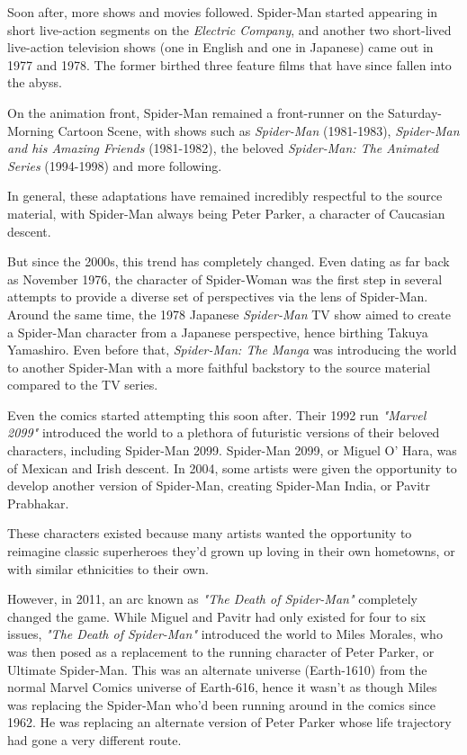 \documentclass[%
 reprint,
 amsmath,amssymb,
 aps,
]{revtex4-2}
\begin{document}
Soon after, more shows and movies followed. Spider-Man started appearing in short live-action segments on the \emph{Electric Company}, and another two short-lived live-action television shows (one in English and one in Japanese) came out in 1977 and 1978. The former birthed three feature films that have since fallen into the abyss.

On the animation front, Spider-Man remained a front-runner on the Saturday-Morning Cartoon Scene, with shows such as \emph{Spider-Man} (1981-1983), \emph{Spider-Man and his Amazing Friends} (1981-1982), the beloved \emph{Spider-Man: The Animated Series} (1994-1998) and more following.

In general, these adaptations have remained incredibly respectful to the source material, with Spider-Man always being Peter Parker, a character of Caucasian descent.

But since the 2000s, this trend has completely changed. Even dating as far back as November 1976, the character of Spider-Woman was the first step in several attempts to provide a diverse set of perspectives via the lens of Spider-Man. Around the same time, the 1978 Japanese \emph{Spider-Man} TV show aimed to create a Spider-Man character from a Japanese perspective, hence birthing Takuya Yamashiro. Even before that, \emph{Spider-Man: The Manga} was introducing the world to another Spider-Man with a more faithful backstory to the source material compared to the TV series.

Even the comics started attempting this soon after. Their 1992 run \emph{"Marvel 2099"} introduced the world to a plethora of futuristic versions of their beloved characters, including Spider-Man 2099. Spider-Man 2099, or Miguel O' Hara, was of Mexican and Irish descent. In 2004, some artists were given the opportunity to develop another version of Spider-Man, creating Spider-Man India, or Pavitr Prabhakar.

These characters existed because many artists wanted the opportunity to reimagine classic superheroes they'd grown up loving in their own hometowns, or with similar ethnicities to their own.

However, in 2011, an arc known as \emph{"The Death of Spider-Man"} completely changed the game. While Miguel and Pavitr had only existed for four to six issues, \emph{"The Death of Spider-Man"} introduced the world to Miles Morales, who was then posed as a replacement to the running character of Peter Parker, or Ultimate Spider-Man. This was an alternate universe (Earth-1610) from the normal Marvel Comics universe of Earth-616, hence it wasn't as though Miles was replacing the Spider-Man who'd been running around in the comics since 1962. He was replacing an alternate version of Peter Parker whose life trajectory had gone a very different route.
\end{document}
